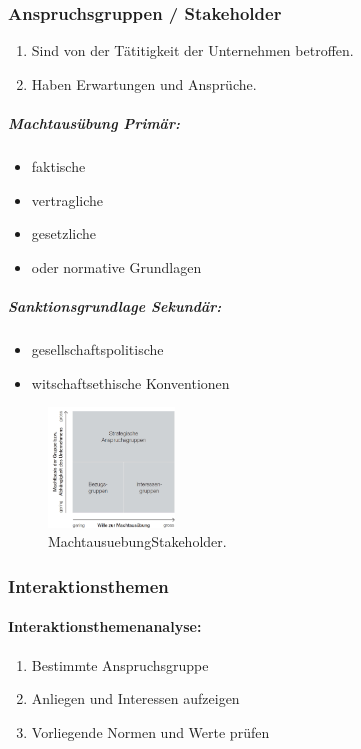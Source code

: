 \documentclass[../ZF_Wing.tex]{subfiles}
\begin{document}
\subsubsection{Anspruchsgruppen / Stakeholder}
\begin{enumerate}
\item Sind von der Tätitigkeit der Unternehmen betroffen. 
\item Haben Erwartungen und Ansprüche.
\end{enumerate}
 

\subparagraph{Machtausübung Primär:}
\begin{itemize}
\item faktische
\item vertragliche
\item gesetzliche
\item oder normative Grundlagen
\end{itemize}


\subparagraph{Sanktionsgrundlage Sekundär:}
\begin{itemize}
\item gesellschaftspolitische
\item witschaftsethische Konventionen
\end{itemize}

\begin{figure}[H]
\centering
\includegraphics[width=0.3\textwidth]{Resources/Image/MachtausuebungStakeholder.png}
\caption{\label{fig:MachtausuebungStakeholder}MachtausuebungStakeholder.}
\end{figure}

\subsubsection{Interaktionsthemen}

\paragraph{Interaktionsthemenanalyse:}
\begin{enumerate}
\item Bestimmte Anspruchsgruppe
\item Anliegen und Interessen aufzeigen
\item Vorliegende Normen und Werte prüfen
\end{enumerate}
\end{document}
